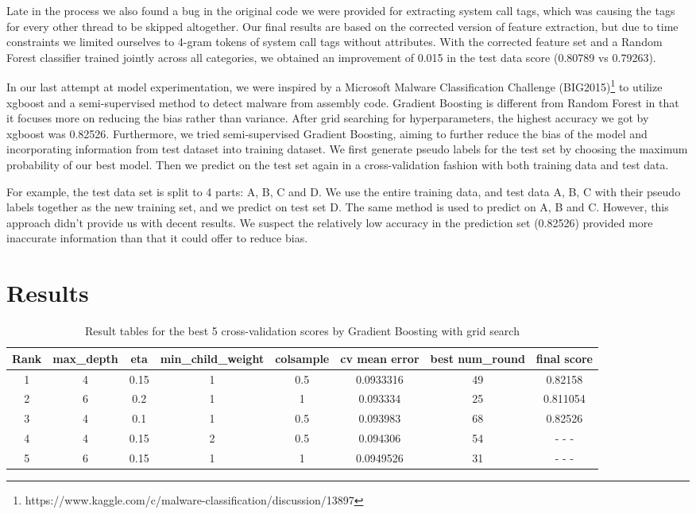 \documentclass[11pt]{article}
\begin{document}
\begin{enumerate}
Late in the process we also found a bug in the original code we were provided for extracting system call tags, which was causing the tags for every other thread to be skipped altogether. Our final results are based on the corrected version of feature extraction, but due to time constraints we limited ourselves to 4-gram tokens of system call tags without attributes. With the corrected feature set and a Random Forest classifier trained jointly across all categories, we obtained an improvement of 0.015 in the test data score (0.80789 vs 0.79263).

In our last attempt at model experimentation, we were inspired by a Microsoft Malware Classification Challenge (BIG2015)\footnote{https://www.kaggle.com/c/malware-classification/discussion/13897} to utilize xgboost and a semi-supervised method to detect malware from assembly code. Gradient Boosting is different from Random Forest in that it focuses more on reducing the bias rather than variance. After grid searching for hyperparameters, the highest accuracy we got by xgboost was 0.82526. Furthermore, we tried semi-supervised Gradient Boosting, aiming to further reduce the bias of the model and incorporating information from test dataset into training dataset. We first generate pseudo labels for the test set by choosing the maximum probability of our best model. Then we predict on the test set again in a cross-validation fashion with both training data and test data.

For example, the test data set is split to 4 parts: A, B, C and D. We use the entire training data, and test data A, B, C with their pseudo labels together as the new training set, and we predict on test set D. The same method is used to predict on A, B and C. However, this approach didn't provide us with decent results. We suspect the relatively low accuracy in the prediction set (0.82526) provided more inaccurate information than that it could offer to reduce bias.

 
\end{enumerate}


\section{Results}

\begin{table}
\centering
\begin{tabular}{cccccccc}
 \toprule
 Rank & max\_depth & eta & min\_child\_weight & colsample & cv mean error & best num\_round & final score\\
 \midrule
  1 & 4 & 0.15 & 1 & 0.5 & 0.0933316 & 49 & 0.82158\\
  2 & 6 & 0.2 & 1 & 1 & 0.093334 & 25 & 0.811054\\
  3 & 4 & 0.1 & 1 & 0.5 & 0.093983 & 68 & 0.82526\\
  4 & 4 & 0.15 & 2 & 0.5 & 0.094306 & 54 & - - -\\
  5 & 6 & 0.15 & 1 & 1 & 0.0949526 & 31 & - - -\\
 \bottomrule
\end{tabular}
\caption{\label{tab:results} Result tables for the best 5 cross-validation scores by Gradient Boosting with grid search}
\end{table}
\end{document}
